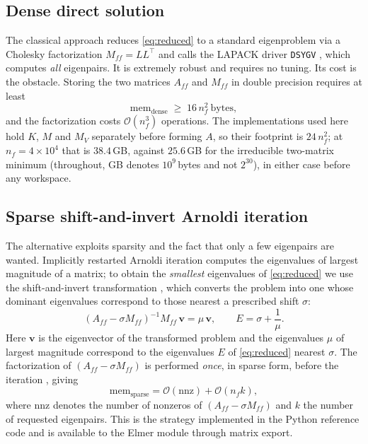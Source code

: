 \documentclass[pdflatex,sn-mathphys-num]{sn-jnl}
\theoremstyle{thmstyleone}%
\theoremstyle{thmstyletwo}%
\theoremstyle{thmstylethree}%
\begin{document}
\subsection{Dense direct solution}

The classical approach reduces \eqref{eq:reduced} to a standard eigenproblem
via a Cholesky factorization $M_{ff} = LL^\top$ and calls the LAPACK driver
\texttt{DSYGV} \cite{anderson1999,davis2006}, which computes \emph{all}
eigenpairs. It is
extremely robust and requires no tuning. Its cost is the obstacle. Storing the
two matrices $A_{ff}$ and $M_{ff}$ in double precision requires at least
%
\begin{equation}\label{eq:densemem}
  \mathrm{mem}_{\text{dense}} \;\geq\; 16\,n_f^2 \ \text{bytes},
\end{equation}
%
and the factorization costs $\mathcal{O}(n_f^3)$ operations. The implementations
used here hold $K$, $M$ and $M_V$ separately before forming $A$, so their
footprint is $24\,n_f^2$; at $n_f = 4\times10^4$ that is $38.4$\,GB, against
$25.6$\,GB for the irreducible two-matrix minimum (throughout, GB denotes
$10^9$\,bytes and not $2^{30}$), in either case before any
workspace.

\subsection{Sparse shift-and-invert Arnoldi iteration}

The alternative exploits sparsity and the fact that only a few eigenpairs are
wanted. Implicitly restarted Arnoldi iteration \cite{lehoucq1998} computes the
eigenvalues of largest magnitude of a matrix; to obtain the \emph{smallest}
eigenvalues of \eqref{eq:reduced} we use the shift-and-invert transformation
\cite{ericsson1980}, which converts the problem into one whose dominant
eigenvalues correspond to those nearest a prescribed shift $\sigma$:
%
\begin{equation}\label{eq:shiftinvert}
  (A_{ff} - \sigma M_{ff})^{-1} M_{ff}\,\mathbf{v} = \mu\,\mathbf{v},
  \qquad
  E = \sigma + \frac{1}{\mu} .
\end{equation}
%
Here $\mathbf{v}$ is the eigenvector of the transformed problem and the
eigenvalues $\mu$ of largest magnitude correspond to the eigenvalues $E$ of
\eqref{eq:reduced} nearest $\sigma$. The factorization of $(A_{ff} - \sigma M_{ff})$ is performed
\emph{once}, in sparse form, before the iteration \cite{davis2006}, giving
%
\begin{equation}\label{eq:sparsemem}
  \mathrm{mem}_{\text{sparse}} = \mathcal{O}(\mathrm{nnz}) + \mathcal{O}(n_f k),
\end{equation}
%
where $\mathrm{nnz}$ denotes the number of nonzeros of
$(A_{ff} - \sigma M_{ff})$ and $k$ the number of requested eigenpairs. This is
the strategy implemented in
the Python reference code and is available to the \textsf{Elmer} module through
matrix export.
\end{document}
